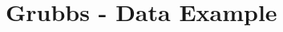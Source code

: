 \documentclass[compress]{beamer}        %
\begin{document}
%














\section{Grubbs - Data Example}
\end{document}
